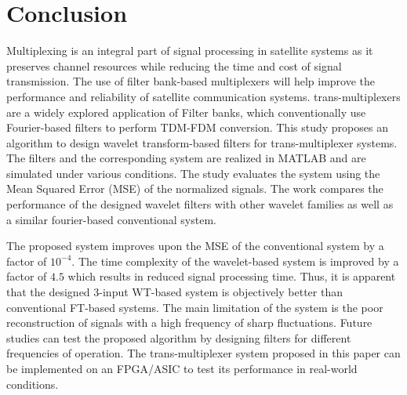 \documentclass[conference]{IEEEtran}
\begin{document}
\section{Conclusion}
Multiplexing is an integral part of signal processing in satellite systems as it preserves channel resources while reducing the time and cost of signal transmission. The use of filter bank-based multiplexers will help improve the performance and reliability of satellite communication systems. trans-multiplexers are a widely explored application of Filter banks, which conventionally use Fourier-based filters to perform TDM-FDM conversion. This study proposes an algorithm to design wavelet transform-based filters for trans-multiplexer systems. The filters and the corresponding system are realized in MATLAB and are simulated under various conditions. The study evaluates the system using the Mean Squared Error (MSE) of the normalized signals. The work compares the performance of the designed wavelet filters with other wavelet families as well as a similar fourier-based conventional system. 

The proposed system improves upon the MSE of the conventional system by a factor of $10^{-4}$. The time complexity of the wavelet-based system is improved by a factor of $4.5$ which results in reduced signal processing time. Thus, it is apparent that the designed 3-input WT-based system is objectively better than conventional FT-based systems. The main limitation of the system is the poor reconstruction of signals with a high frequency of sharp fluctuations. Future studies can test the proposed algorithm by designing filters for different frequencies of operation. The trans-multiplexer system proposed in this paper can be implemented on an FPGA/ASIC to test its performance in real-world conditions.
\end{document}

